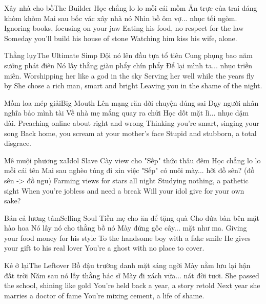 \begin{tutuyetbox}{Xây nhà cho bồ}{The Builder}
Học chẳng lo lo mỗi cái mồm
Ăn trực của trai dáng khòm khòm
Mai sau bốc vác xây nhà nó
Nhìn bồ ôm vợ... nhục tối ngòm.
\tcblower
Ignoring books, focusing on your jaw
Eating his food, no respect for the law
Someday you'll build his house of stone
Watching him kiss his wife, alone.
\end{tutuyetbox}

\begin{tutuyetbox}{Thằng lụy}{The Ultimate Simp}
Đội nó lên đầu tựa tổ tiên
Cung phụng bao năm sướng phát điên
Nó lấy thằng giàu phẩy chín phẩy
Để lại mình ta... nhục triền miên.
\tcblower
Worshipping her like a god in the sky
Serving her well while the years fly by
She chose a rich man, smart and bright
Leaving you in the shame of the night.
\end{tutuyetbox}

\begin{tutuyetbox}{Mồm loa mép giải}{Big Mouth}
Lên mạng răn đời chuyện đúng sai
Dạy người nhân nghĩa bảo mình tài
Về nhà mẹ mắng quay ra chửi
Học dốt mặt lì... nhục dặm dài.
\tcblower
Preaching online about right and wrong
Thinking you're smart, singing your song
Back home, you scream at your mother's face
Stupid and stubborn, a total disgrace.
\end{tutuyetbox}

\begin{tutuyetbox}{Mê muội phương xa}{Idol Slave}
Cày view cho "Sếp" thức thâu đêm
Học chẳng lo lo mỗi cái tên
Mai sau nghèo túng đi xin việc
"Sếp" có nuôi mày... hỡi đồ sên? (đồ sên -> đồ ngu)
\tcblower
Farming views for stars all night
Studying nothing, a pathetic sight
When you're jobless and need a break
Will your idol give for your own sake?
\end{tutuyetbox}

\begin{tutuyetbox}{Bán cả lương tâm}{Selling Soul}
Tiền mẹ cho ăn để tặng quà
Cho đứa bàn bên mặt hào hoa
Nó lấy nó cho thằng bồ nó
Mày đứng gốc cây... mặt như ma.
\tcblower
Giving your food money for his style
To the handsome boy with a fake smile
He gives your gift to his real lover
You're a ghost with no place to cover.
\end{tutuyetbox}

\begin{tutuyetbox}{Kẻ ở lại}{The Leftover}
Bồ đậu trường danh mặt sáng ngời
Mày nằm lưu lại hận đất trời
Năm sau nó lấy thằng bác sĩ
Mày đi xách vữa... nát đời tươi.
\tcblower
She passed the school, shining like gold
You're held back a year, a story retold
Next year she marries a doctor of fame
You're mixing cement, a life of shame.
\end{tutuyetbox}

